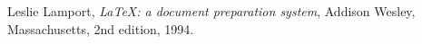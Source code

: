	
	\begin{thebibliography}{9}
		Leslie Lamport,
		\textit{\LaTeX: a document preparation system},
		Addison Wesley, Massachusetts,
		2nd edition,
		1994.	
	\end{thebibliography}

	

	
